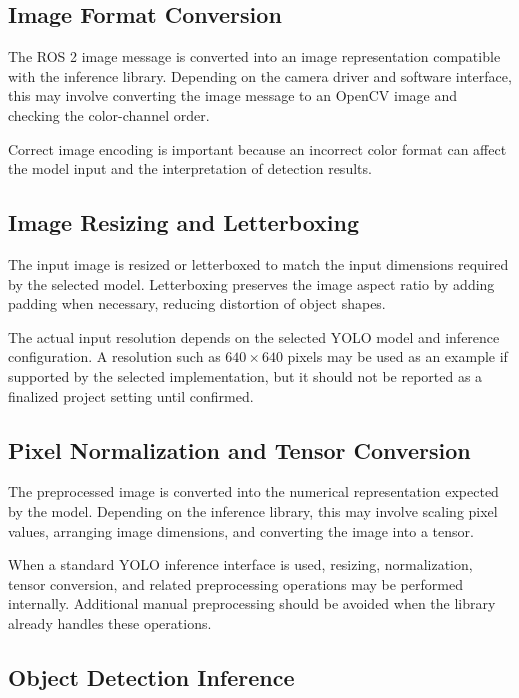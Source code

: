 \subsection{Image Format Conversion}

The ROS 2 image message is converted into an image representation compatible with the inference library. Depending on the camera driver and software interface, this may involve converting the image message to an OpenCV image and checking the color-channel order.

Correct image encoding is important because an incorrect color format can affect the model input and the interpretation of detection results.

\subsection{Image Resizing and Letterboxing}

The input image is resized or letterboxed to match the input dimensions required by the selected model. Letterboxing preserves the image aspect ratio by adding padding when necessary, reducing distortion of object shapes.

The actual input resolution depends on the selected YOLO model and inference configuration. A resolution such as $640 \times 640$ pixels may be used as an example if supported by the selected implementation, but it should not be reported as a finalized project setting until confirmed.

\subsection{Pixel Normalization and Tensor Conversion}

The preprocessed image is converted into the numerical representation expected by the model. Depending on the inference library, this may involve scaling pixel values, arranging image dimensions, and converting the image into a tensor.

When a standard YOLO inference interface is used, resizing, normalization, tensor conversion, and related preprocessing operations may be performed internally. Additional manual preprocessing should be avoided when the library already handles these operations.

\subsection{Object Detection Inference}

